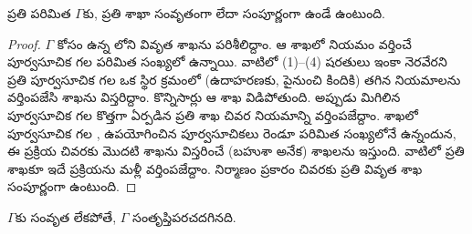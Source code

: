 \documentclass[../../../include/open-logic-section]{subfiles}
\begin{document}
\begin{prop}
  ప్రతి పరిమిత $\Gamma$కు, ప్రతి శాఖా సంవృతంగా లేదా సంపూర్ణంగా ఉండే
   ఉంటుంది.
\end{prop}

\begin{proof}
  $\Gamma$ కోసం ఉన్న లోని
  వివృత శాఖను పరిశీలిద్దాం. ఆ శాఖలో నియమం వర్తించే
  పూర్వసూచిక గల 
  పరిమిత సంఖ్యలో ఉన్నాయి. వాటిలో (1)--(4) షరతులు
  ఇంకా నెరవేరని ప్రతి పూర్వసూచిక గల 
  ఒక స్థిర క్రమంలో (ఉదాహరణకు, పైనుంచి కిందికి)
  తగిన నియమాలను వర్తింపజేసి శాఖను విస్తరిద్దాం.
  కొన్నిసార్లు ఆ శాఖ విడిపోతుంది. అప్పుడు మిగిలిన
  పూర్వసూచిక గల  కొత్తగా
  ఏర్పడిన ప్రతి శాఖ చివర నియమాన్ని వర్తింపజేద్దాం. శాఖలో
  పూర్వసూచిక గల , ఉపయోగించిన
  పూర్వసూచికలు రెండూ పరిమిత సంఖ్యలోనే ఉన్నందున, ఈ
  ప్రక్రియ చివరకు మొదటి శాఖను విస్తరించే (బహుశా అనేక)
  శాఖలను ఇస్తుంది. వాటిలో ప్రతి శాఖకూ ఇదే ప్రక్రియను
  మళ్లీ వర్తింపజేద్దాం. నిర్మాణం ప్రకారం
  చివరకు ప్రతి వివృత శాఖ సంపూర్ణంగా ఉంటుంది.
\end{proof}

\begin{thm}[సంపూర్ణత]
  $\Gamma$కు సంవృత  లేకపోతే,
  $\Gamma$ సంతృప్తిపరచదగినది.
\end{thm}
\end{document}
